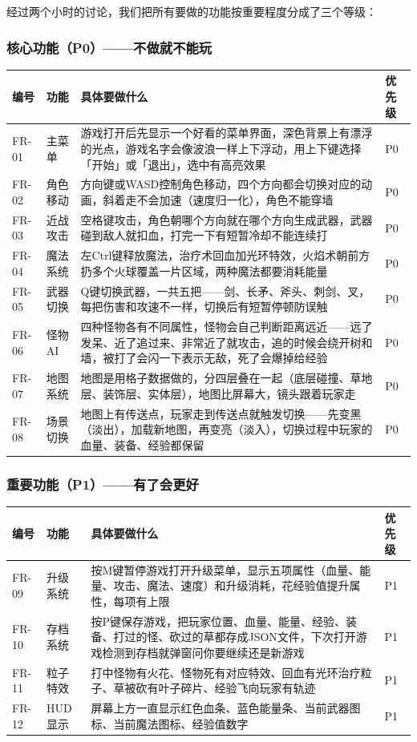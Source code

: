 \documentclass[12pt,a4paper]{article}
\begin{document}
经过两个小时的讨论，我们把所有要做的功能按重要程度分成了三个等级：

\subsubsection{核心功能（P0）——不做就不能玩}

\begin{longtable}{p{1.2cm}p{2.5cm}p{7cm}p{1.2cm}}
\toprule
\textbf{编号} & \textbf{功能} & \textbf{具体要做什么} & \textbf{优先级} \\
\midrule
\endhead
FR-01 & 主菜单 & 游戏打开后先显示一个好看的菜单界面，深色背景上有漂浮的光点，游戏名字会像波浪一样上下浮动，用上下键选择「开始」或「退出」，选中有高亮效果 & P0 \\
FR-02 & 角色移动 & 方向键或WASD控制角色移动，四个方向都会切换对应的动画，斜着走不会加速（速度归一化），角色不能穿墙 & P0 \\
FR-03 & 近战攻击 & 空格键攻击，角色朝哪个方向就在哪个方向生成武器，武器碰到敌人就扣血，打完一下有短暂冷却不能连续打 & P0 \\
FR-04 & 魔法系统 & 左Ctrl键释放魔法，治疗术回血加光环特效，火焰术朝前方扔多个火球覆盖一片区域，两种魔法都要消耗能量 & P0 \\
FR-05 & 武器切换 & Q键切换武器，一共五把——剑、长矛、斧头、刺剑、叉，每把伤害和攻速不一样，切换后有短暂停顿防误触 & P0 \\
FR-06 & 怪物AI & 四种怪物各有不同属性，怪物会自己判断距离远近——远了发呆、近了追过来、非常近了就攻击，追的时候会绕开树和墙，被打了会闪一下表示无敌，死了会爆掉给经验 & P0 \\
FR-07 & 地图系统 & 地图是用格子数据做的，分四层叠在一起（底层碰撞、草地层、装饰层、实体层），地图比屏幕大，镜头跟着玩家走 & P0 \\
FR-08 & 场景切换 & 地图上有传送点，玩家走到传送点就触发切换——先变黑（淡出），加载新地图，再变亮（淡入），切换过程中玩家的血量、装备、经验都保留 & P0 \\
\bottomrule
\end{longtable}

\subsubsection{重要功能（P1）——有了会更好}

\begin{longtable}{p{1.2cm}p{2.5cm}p{7cm}p{1.2cm}}
\toprule
\textbf{编号} & \textbf{功能} & \textbf{具体要做什么} & \textbf{优先级} \\
\midrule
\endhead
FR-09 & 升级系统 & 按M键暂停游戏打开升级菜单，显示五项属性（血量、能量、攻击、魔法、速度）和升级消耗，花经验值提升属性，每项有上限 & P1 \\
FR-10 & 存档系统 & 按P键保存游戏，把玩家位置、血量、能量、经验、装备、打过的怪、砍过的草都存成JSON文件，下次打开游戏检测到存档就弹窗问你要继续还是新游戏 & P1 \\
FR-11 & 粒子特效 & 打中怪物有火花、怪物死有对应特效、回血有光环治疗粒子、草被砍有叶子碎片、经验飞向玩家有轨迹 & P1 \\
FR-12 & HUD显示 & 屏幕上方一直显示红色血条、蓝色能量条、当前武器图标、当前魔法图标、经验值数字 & P1 \\
\bottomrule
\end{longtable}
\end{document}
